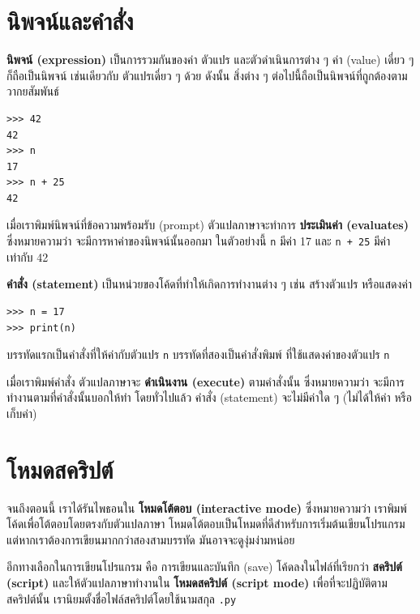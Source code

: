 \section{นิพจน์และคำสั่ง} %

{\bf นิพจน์ (expression)} เป็นการรวมกันของค่า ตัวแปร และตัวดำเนินการต่าง ๆ
ค่า (value) เดี่ยว ๆ ก็ถือเป็นนิพจน์ เช่นเดียวกับ ตัวแปรเดี่ยว ๆ ด้วย
ดังนั้น สิ่งต่าง ๆ ต่อไปนี้ถือเป็นนิพจน์ที่ถูกต้องตามวากยสัมพันธ์

\begin{verbatim}
>>> 42
42
>>> n
17
>>> n + 25
42
\end{verbatim}
%
เมื่อเราพิมพ์นิพจน์ที่ข้อความพร้อมรับ (prompt) ตัวแปลภาษาจะทำการ {\bf ประเมินค่า (evaluates)}  
ซึ่งหมายความว่า จะมีการหาค่าของนิพจน์นั้นออกมา ในตัวอย่างนี้ {\tt n} มีค่า 17
และ {\tt n + 25} มีค่าเท่ากับ 42

{\bf คำสั่ง (statement)} เป็นหน่วยของโค้ดที่ทำให้เกิดการทำงานต่าง ๆ เช่น สร้างตัวแปร หรือแสดงค่า

\begin{verbatim}
>>> n = 17
>>> print(n)
\end{verbatim}
%
บรรทัดแรกเป็นคำสั่งที่ให้ค่ากับตัวแปร {\tt n}
บรรทัดที่สองเป็นคำสั่งพิมพ์ ที่ใช้แสดงค่าของตัวแปร {\tt n}

เมื่อเราพิมพ์คำสั่ง ตัวแปลภาษาจะ {\bf ดำเนินงาน (execute)} ตามคำสั่งนั้น ซึ่งหมายความว่า
จะมีการทำงานตามที่คำสั่งนั้นบอกให้ทำ  โดยทั่วไปแล้ว คำสั่ง (statement) จะไม่มีค่าใด ๆ 
(ไม่ได้ให้ค่า หรือเก็บค่า)


\section{โหมดสคริปต์} %

จนถึงตอนนี้ เราได้รันไพธอนใน {\bf โหมดโต้ตอบ (interactive mode)} ซึ่งหมายความว่า 
เราพิมพ์โค้ดเพื่อโต้ตอบโดยตรงกับตัวแปลภาษา โหมดโต้ตอบเป็นโหมดที่ดีสำหรับการเริ่มต้นเขียนโปรแกรม
แต่หากเราต้องการเขียนมากกว่าสองสามบรรทัด มันอาจจะดูงุ่มง่ามหน่อย

อีกทางเลือกในการเขียนโปรแกรม คือ การเขียนและบันทึก (save) โค้ดลงในไฟล์ที่เรียกว่า 
{\bf สคริปต์ (script)} และให้ตัวแปลภาษาทำงานใน {\bf โหมดสคริปต์ (script mode)} 
เพื่อที่จะปฏิบัติตามสคริปต์นั้น เรานิยมตั้งชื่อไฟล์สคริปต์โดยใช้นามสกุล {\tt .py}  


